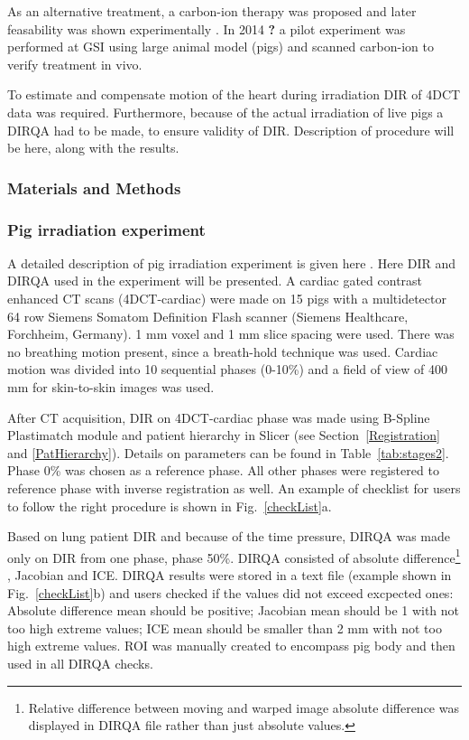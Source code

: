 \documentclass[type=dr, dr=rernat, accentcolor=tud7b,colorbacktitle, bigchapter, openright, twoside, 12pt ]{tudthesis}
\begin{document}
As an alternative treatment, a carbon-ion therapy was proposed \cite{Bert2012} and later feasability was shown experimentally \cite{Lehmann2015b}. In 2014 \textbf{?} a pilot experiment was performed at GSI using large animal model (pigs) and
scanned carbon-ion to verify treatment in vivo.

To estimate and compensate motion of the heart during irradiation DIR of 4DCT data was required. Furthermore, because of the actual irradiation of live pigs a DIRQA had to be made, to ensure validity of DIR. Description of procedure will be here,
along with the results.



\subsubsection{Materials and Methods}


\subsubsection{Pig irradiation experiment}

A detailed description of pig irradiation experiment is given here \cite{Lehmann2015}. Here DIR and DIRQA used in the experiment will be presented. A cardiac gated contrast enhanced CT scans (4DCT-cardiac) were made on 15 pigs with a multidetector 64 row Siemens Somatom Definition Flash scanner 
(Siemens Healthcare, Forchheim, Germany). 1 mm voxel and 1 mm slice spacing were used. There was no breathing motion present, since a breath-hold technique was used. Cardiac motion was divided into 10 sequential phases (0-10\%) and a field of view of 400 mm for skin-to-skin images was used.

After CT acquisition, DIR on 4DCT-cardiac phase was made using B-Spline Plastimatch module and patient hierarchy in Slicer (see Section~\ref{Registration} and \ref{PatHierarchy}). Details on parameters can be found in Table~\ref{tab:stages2}. 
Phase 0\% was chosen as a reference phase. All other phases were registered to reference phase with inverse registration as well. An example of checklist for users to follow the right procedure is shown in Fig.~\ref{checkList}a.

Based on lung patient DIR and because of the time pressure, DIRQA was made only on DIR from one phase, phase 50\%. DIRQA consisted of absolute difference\footnote{Relative difference between moving and warped image absolute difference was displayed in DIRQA file rather than just absolute values.} 
, Jacobian and ICE. DIRQA results were stored in a text file (example shown in Fig.~\ref{checkList}b) and users checked if the values did not exceed excpected ones: Absolute difference
mean should be positive; Jacobian mean should be 1 with not too high extreme values; ICE mean should be smaller than 2 mm with not too high extreme values. ROI was manually created to encompass pig body and then used in all DIRQA checks.
\end{document}
